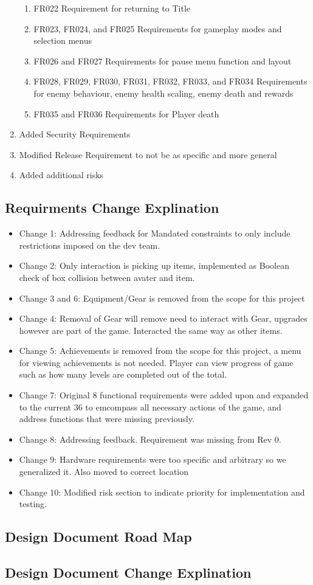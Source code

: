 \documentclass[]{article}
\begin{document}
\begin{enumerate}
\begin{enumerate}
		\item FR022 Requirement for returning to Title
		\item FR023, FR024, and FR025 Requirements for gameplay modes and selection menus
		\item FR026 and FR027 Requirements for pause menu function and layout
		\item FR028, FR029, FR030, FR031, FR032, FR033, and FR034 Requirements for enemy behaviour, enemy health scaling, enemy death and rewards
		\item FR035 and FR036 Requirements for Player death
	\end{enumerate}
        \item Added Security Requirements
        \item Modified Release Requirement to not be as specific and more general
        \item Added additional risks
    \end{enumerate}

\subsection*{Requirments Change Explination}
\begin{itemize}
		\item Change 1: Addressing feedback for Mandated constraints to only include restrictions imposed on the dev team.
		\item Change 2: Only interaction is picking up items, implemented as Boolean check of box collision between avater and item.
		\item Change 3 and 6: Equipment/Gear is removed from the scope for this project
		\item Change 4: Removal of Gear will remove need to interact with Gear, upgrades however are part of the game. Interacted the same way as other items.
		\item Change 5: Achievements is removed from the scope for this project, a menu for viewing achievements is not needed. Player can view progress of game such as how many levels are completed out of the total.
		\item Change 7: Original 8 functional requirements were added upon and expanded to the current 36 to emcompass all necessary actions of the game, and address functions that were missing previously.
		\item Change 8: Addressing feedback. Requirement was missing from Rev 0.
		\item Change 9: Hardware requirements were too specific and arbitrary so we generalized it. Also moved to correct location
		\item Change 10: Modified risk section to indicate priority for implementation and testing.
	\end{itemize}

\subsection*{Design Document Road Map}

\subsection*{Design Document Change Explination}
\end{document}
